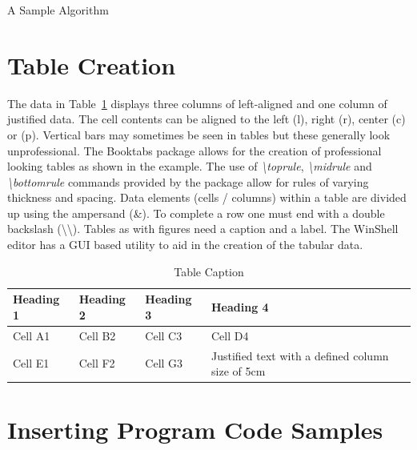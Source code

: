 \begin{algorithm}
{}
\caption{A Sample Algorithm} \label{alg:using:SampleAlgorithm}
\end{algorithm}


\section{Table Creation}

The data in Table~\ref{tab:using:TableExample} displays three columns of left-aligned and one column of justified data. The cell contents can be aligned to the left (l), right (r), center (c) or (p). Vertical bars may sometimes be seen in tables but these generally look unprofessional. The Booktabs package \citep{online:Fear2016BookTabs} allows for the creation of professional looking tables as shown in the example.  The use of \emph{\textbackslash toprule}, \emph{\textbackslash midrule} and \emph{\textbackslash bottomrule} commands provided by the package allow for rules of varying thickness and spacing. Data elements (cells / columns) within a table are divided up using the ampersand (\&). To complete a row one must end with a double backslash (\textbackslash\textbackslash). Tables as with figures need a caption and a label. The WinShell editor has a GUI based utility to aid in the creation of the tabular data.

\begin{table}[H]
\caption{Table Caption}\label{tab:using:TableExample}
\centering
\small
\begin{tabular}{lllp{5cm}}
\toprule \textbf{Heading 1}& \textbf{Heading 2}&\textbf{Heading 3}&\textbf{Heading 4}\\
\midrule
Cell A1 & Cell B2 & Cell C3 & Cell D4\\
Cell E1 & Cell F2 & Cell G3 & Justified text with a defined column size of 5cm\\
\bottomrule
\end{tabular}
\end{table}





\section{Inserting Program Code Samples}

